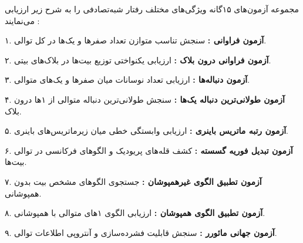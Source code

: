 

مجموعه آزمون‌های ۱۵گانه  ویژگی‌های مختلف رفتار شبه‌تصادفی را به شرح زیر ارزیابی می‌نمایند :\par

۱. \textbf{آزمون فراوانی :} سنجش تناسب متوازن تعداد صفرها و یک‌ها در کل توالی.\par

۲. \textbf{آزمون فراوانی درون بلاک :} ارزیابی یکنواختی توزیع بیت‌ها در بلاک‌های ‌بیتی.\par

۳. \textbf{آزمون دنباله‌ها :} ارزیابی تعداد نوسانات میان صفرها و یک‌های متوالی.\par

۴. \textbf{آزمون طولانی‌ترین دنباله یک‌ها :} سنجش طولانی‌ترین دنباله متوالی از ۱ها درون بلاک.\par

۵. \textbf{آزمون رتبه ماتریس باینری :} ارزیابی وابستگی خطی میان زیرماتریس‌های باینری.\par

۶. \textbf{آزمون تبدیل فوریه گسسته :} کشف قله‌های پریودیک و الگوهای فرکانسی در توالی بیت‌ها.\par

۷. \textbf{آزمون تطبیق الگوی غیرهمپوشان :} جستجوی الگوهای مشخص بیت بدون همپوشانی.\par

۸. \textbf{آزمون تطبیق الگوی همپوشان :} ارزیابی الگوی ۱های متوالی با همپوشانی.\par

۹. \textbf{آزمون جهانی مائورر :} سنجش قابلیت فشرده‌سازی و آنتروپی اطلاعات توالی.\par


